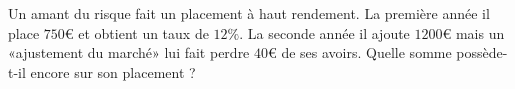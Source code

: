
\begin{exercice}\label{exosmath-0559}

    Un amant du risque fait un placement à haut rendement. La première année il place \( 750\)€ et obtient un taux de \( 12\%\). La seconde année il ajoute \( 1200\)€ mais un «ajustement du marché» lui fait perdre \( 40\)€ de ses avoirs. Quelle somme possède-t-il encore sur son placement ?

\end{exercice}
